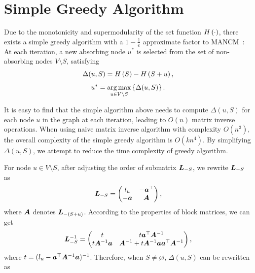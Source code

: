 \documentclass[sigconf]{acmart}
\begin{document}
\section{Simple Greedy Algorithm}\label{sec:simple-greedy}

Due to the monotonicity and supermodularity of the set function \(H\left(\cdot\right)\), there exists a simple greedy algorithm with a \(1-\frac1e\) approximate factor to MANCM~\cite{NeWoFi78}:
At each iteration, a new absorbing node \(u^*\) is selected from the set of non-absorbing nodes \(V\setminus S\), satisfying
\[\Delta(u,S)=H\left(S\right)-H\left(S+u\right),\]
\[u^*=\operatorname*{arg\,max}_{u\in V\setminus S}\left\{\Delta(u,S) \right\}.\]

It is easy to find that the simple algorithm above needs to compute \(\Delta(u,S)\) for each node \(u\) in the graph at each iteration, leading to \(O(n)\) matrix inverse operations.
When using naive matrix inverse algorithm with complexity \(O(n^3)\), the overall complexity of the simple greedy algorithm is \(O(kn^4)\).
By simplifying \(\Delta(u,S)\), we attempt to reduce the time complexity of greedy algorithm.

For node \(u\in V\setminus S\), after adjusting the order of submatrix \(\boldsymbol{L}_{-S}\), we rewrite \(\boldsymbol{L}_{-S}\) as
\[\boldsymbol{L}_{-S}=\begin{pmatrix}l_u & -\boldsymbol{a}^\top \\-\boldsymbol{a}&\boldsymbol{A}\end{pmatrix},\]
where \(\boldsymbol{A}\) denotes \(\boldsymbol{L}_{-(S+u)}\).
According to the properties of block matrices, we can get
\[\boldsymbol{L}_{-S}^{-1}=\begin{pmatrix}
        t & t\boldsymbol{a}^\top\boldsymbol{A}^{-1} \\t\boldsymbol{A}^{-1}\boldsymbol{a}&\boldsymbol{A}^{-1}+t\boldsymbol{A}^{-1}\boldsymbol{a}\boldsymbol{a}^\top\boldsymbol{A}^{-1}
    \end{pmatrix},\]
where \(t=(l_u-\boldsymbol{a}^\top\boldsymbol{A}^{-1}\boldsymbol{a})^{-1}\).
Therefore, when \(S\neq\varnothing\), \(\Delta(u,S)\) can be rewritten as
\end{document}
